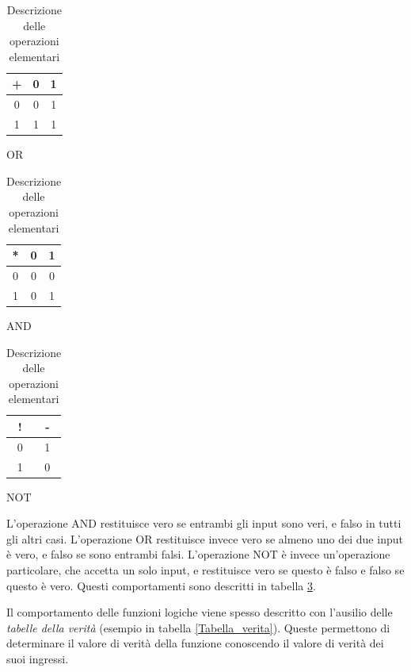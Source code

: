 \documentclass{article}
\begin{document}
\begin{table}[h]
  \centering
  \begin{subtable}{0.3\textwidth}
  \centering
    \begin{tabular}{| c | c c |}
    \hline
    + & 0 & 1 \\ \hline
    0 & 0 & 1 \\
    1 & 1 & 1 \\ \hline
    \end{tabular}
    \caption{OR}
  \end{subtable}
  \begin{subtable}{0.3\textwidth}
  \centering
    \begin{tabular}{| c | c c |}
    \hline
    * & 0 & 1 \\ \hline
    0 & 0 & 0 \\
    1 & 0 & 1 \\ \hline
    \end{tabular}
    \caption{AND}
  \end{subtable}
  \begin{subtable}{0.3\textwidth}
  \centering
    \begin{tabular}{| c | c |}
    \hline
    ! & - \\ \hline
    0 & 1 \\
    1 & 0 \\ \hline
    \end{tabular}
    \caption{NOT}
  \end{subtable}
  \caption{Descrizione delle operazioni elementari}
  \label{Tabella_operazioni}
\end{table}

L'operazione AND restituisce vero se entrambi gli input sono veri, e falso in tutti gli altri casi. L'operazione OR restituisce invece vero se almeno uno dei due input è vero, e falso se sono entrambi falsi. L'operazione NOT è invece un'operazione particolare, che accetta un solo input, e restituisce vero se questo è falso e falso se questo è vero. Questi comportamenti sono descritti in tabella \ref{Tabella_operazioni}.

\vspace{3mm}

Il comportamento delle funzioni logiche viene spesso descritto con l'ausilio delle \textit{tabelle della verità} (esempio in tabella \ref{Tabella_verita}). Queste permettono di determinare il valore di verità della funzione conoscendo il valore di verità dei suoi ingressi.
\end{document}
